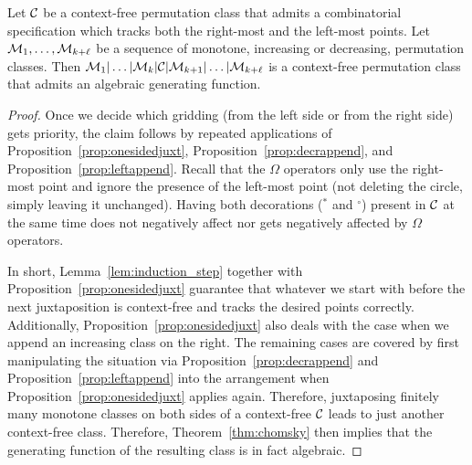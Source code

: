 \documentclass[12pt, a4paper, twoside]{report}
\begin{document}
\begin{theorem}
  \label{thm:iterjuxt_main}
  Let $\mathcal{C}$ be a context-free permutation class that admits a combinatorial specification which tracks both the right-most and the left-most points. Let $\mathcal{M}_1,\ldots,\mathcal{M}_{k+\ell}$ be a sequence of monotone, increasing or decreasing, permutation classes. Then $\mathcal{M}_1|\ldots|\mathcal{M}_k|\mathcal{C}|\mathcal{M}_{k+1}|\ldots|\mathcal{M}_{k+\ell}$ is a context-free permutation class that admits an algebraic generating function.
\end{theorem}
\begin{proof}
  Once we decide which gridding (from the left side or from the right side) gets priority, the claim follows by repeated applications of Proposition~\ref{prop:onesidedjuxt}, Proposition~\ref{prop:decrappend}, and Proposition~\ref{prop:leftappend}. Recall that the $\Omega$ operators only use the right-most point and ignore the presence of the left-most point (not deleting the circle, simply leaving it unchanged). Having both decorations (${}^*$ and ${}^\circ$) present in $\mathcal{C}$ at the same time does not negatively affect nor gets negatively affected by $\Omega$ operators.

  In short, Lemma~\ref{lem:induction_step} together with Proposition~\ref{prop:onesidedjuxt} guarantee that whatever we start with before the next juxtaposition is context-free and tracks the desired points correctly. Additionally, Proposition~\ref{prop:onesidedjuxt} also deals with the case when we append an increasing class on the right. The remaining cases are covered by first manipulating the situation via Proposition~\ref{prop:decrappend} and Proposition~\ref{prop:leftappend} into the arrangement when Proposition~\ref{prop:onesidedjuxt} applies again. Therefore, juxtaposing finitely many monotone classes on both sides of a context-free $\mathcal{C}$ leads to just another context-free class. Therefore, Theorem~\ref{thm:chomsky} then implies that the generating function of the resulting class is in fact algebraic.
\end{proof}
\end{document}
